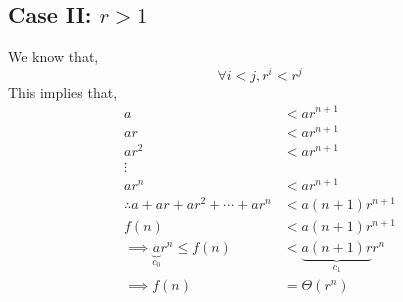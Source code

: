 \documentclass[addpoints]{exam}
\begin{document}
\begin{questions}
\begin{solution}
		\subsection*{Case II: \(r > 1\)}
		We know that,
		\[\forall i < j, r^{i} < r^{j}\]
		This implies that,
		\begin{equation}
			\begin{aligned}
				a                                            & < ar^{n+1}                        \\
				ar                                           & < ar^{n+1}                        \\
				ar^2                                         & < ar^{n+1}                        \\
				\vdots                                                                           \\
				ar^n                                         & < ar^{n+1}                        \\
				\hline
				\therefore a+ar+ar^2+\cdots+ar^n             & < a(n+1)r^{n+1}                   \\
				f(n)                                         & < a(n+1)r^{n+1}                   \\
				\implies \underbrace{a}_{c_0}r^{n} \leq f(n) & < \underbrace{a(n+1)r}_{c_1}r^{n} \\
				\implies f(n)                                & = \Theta(r^n)
			\end{aligned}
		\end{equation}

		\newpage


\end{solution}
\end{questions}
\end{document}

